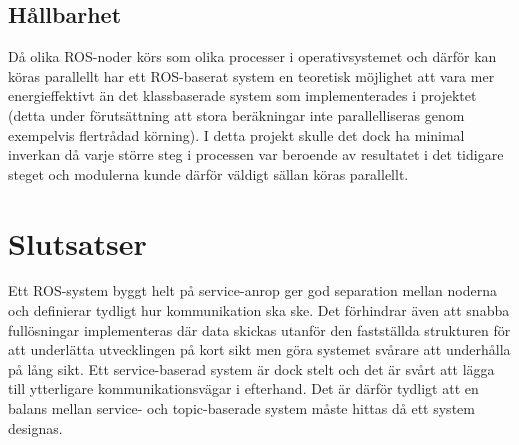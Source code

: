 \subsection{Hållbarhet}
Då olika ROS-noder körs som olika processer i operativsystemet och därför kan köras parallellt har ett ROS-baserat system en teoretisk möjlighet att vara mer energieffektivt än det klassbaserade system som implementerades i projektet (detta under förutsättning att stora beräkningar inte parallelliseras genom exempelvis flertrådad körning). I detta projekt skulle det dock ha minimal inverkan då varje större steg i processen var beroende av resultatet i det tidigare steget och modulerna kunde därför väldigt sällan köras parallellt.


\section{Slutsatser}
\label{sec:conclusions-lundberg}

Ett ROS-system byggt helt på service-anrop ger god separation mellan noderna och definierar tydligt hur kommunikation ska ske. Det förhindrar även att snabba fullösningar implementeras där data skickas utanför den fastställda strukturen för att underlätta utvecklingen på kort sikt men göra systemet svårare att underhålla på lång sikt. Ett service-baserad system är dock stelt och det är svårt att lägga till ytterligare kommunikationsvägar i efterhand. Det är därför tydligt att en balans mellan service- och topic-baserade system måste hittas då ett system designas. 

